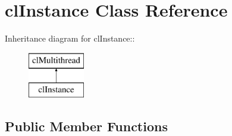 \hypertarget{classcl_instance}{
\section{clInstance Class Reference}
\label{classcl_instance}
}
Inheritance diagram for clInstance::\begin{figure}[H]
\begin{center}
\leavevmode
\includegraphics[height=2cm]{classcl_instance}
\end{center}
\end{figure}
\subsection*{Public Member Functions}

